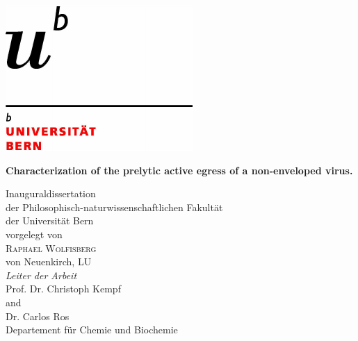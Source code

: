 \documentclass[11pt, titlepage, a4paper, twoside, onecolumn, DIV=calc]{scrbook} %
\begin{document}





\setlength{\footskip}{35mm}


\captionsetup[table]{singlelinecheck=off} %




\begin{titlepage}
\begin{flushright}
\includegraphics[scale=0.8, trim= 1mm 1mm 5mm 20mm]{logo} \\[2 cm]
\end{flushright}
\begin{center}
\begin{spacing}{2.5}
{\Huge \bfseries Characterization of the prelytic active egress of a non-enveloped virus.} \\[2 cm]
\end{spacing}
{\Large Inauguraldissertation \\
der Philosophisch-naturwissenschaftlichen Fakultät \\
der Universität Bern \\[2cm]
{\large vorgelegt von}\\[0.3 cm]
{\LARGE \textsc{Raphael Wolfisberg}} \\[0.3 cm] 
{\large von Neuenkirch, LU} \\ [1.2 cm]
{\Large \emph{Leiter der Arbeit}\\ [0.3 cm]
{\textsc Prof. Dr. Christoph Kempf} \\
and \\
{\textsc Dr. Carlos Ros} \\ [0.9 cm]
Departement für Chemie und Biochemie}}
\end{center}
\end{titlepage}
\end{document}
